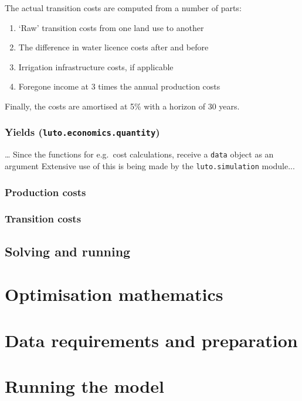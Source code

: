 \documentclass{draft}
\begin{document}
The actual transition costs are computed from a number of parts:
\begin{enumerate}
	\item `Raw' transition costs from one land use to another
	\item The difference in water licence costs after and before
	\item Irrigation infrastructure costs, if applicable
	\item Foregone income at 3 times the annual production costs
\end{enumerate}

Finally, the costs are amortised at 5\% with a horizon of 30 years.

\subsubsection{Yields (\texttt{luto.economics.quantity})}
\ldots
Since the functions for e.g.\ cost calculations, receive a \texttt{data} object as an argument %
 Extensive use of this is being made by the \texttt{luto.simulation} module...

 \subsubsection{Production costs}
\subsubsection{Transition costs}

\subsection{Solving and running}\label{subsec:solvers}


\section{Optimisation mathematics}\label{sec:mathematics}

\section{Data requirements and preparation}\label{sec:dataprep}

\section{Running the model}\label{sec:running}
\end{document}
